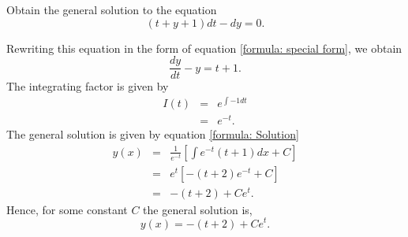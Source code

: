 \documentclass[11pt]{article}
\begin{document}
\begin{problem}
Obtain the general solution to the equation
\begin{equation}
     (t+y+1)dt -  dy =0 .
\end{equation}
\end{problem}
\begin{solution}
Rewriting this equation in the form of equation \eqref{formula: special form}, we obtain
\begin{equation*}
\dfrac{ dy }{dt} - y= t+1.
\end{equation*}
The integrating factor is given by 
\begin{eqnarray*}
I(t) & = & e^{\int  -1 dt} \\
& = & e^{-t}.
\end{eqnarray*}
The general solution is given by equation \eqref{formula: Solution}
\begin{eqnarray*}
y(x) & = & \frac{1}{e^{-t}} \left[ \int e^{-t}(t+1) dx + C \right]\\
& = & e^{t}  \left[ -(t+2)e^{-t} + C \right]\\
& = & -(t+2) + C e^{t}.
\end{eqnarray*}
Hence, for some constant $C$ the general solution is, 
\begin{equation*}
     \boxed{y(x) = -(t+2) + C e^{t} }.
\end{equation*}

\end{solution}
\end{document}
